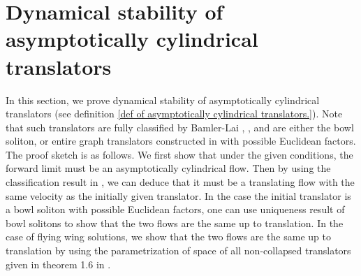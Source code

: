 \documentclass[pdflatex,sn-mathphys-num]{sn-jnl}%
\begin{document}
\section{Dynamical stability of asymptotically cylindrical translators}\label{asymptoticallycylindricalsection}
In this section, we prove dynamical stability of asymptotically cylindrical translators (see definition \ref{def of asymptotically cylindrical translators.}). Note that such translators are fully classified by Bamler-Lai \cite{Bamler2025-pdeodi}, \cite{Bamler2025-thclassification}, and are either the bowl soliton, or entire graph translators constructed in \cite{Hoffman2018GraphicalTF} with possible Euclidean factors. The proof sketch is as follows. We first show that under the given conditions, the forward limit must be an asymptotically cylindrical flow. Then by using the classification result in \cite{Bamler2025-thclassification}, we can deduce that it must be a translating flow with the same velocity as the initially given translator. In the case the initial translator is a bowl soliton with possible Euclidean factors, one can use uniqueness result of bowl solitons \cite{Haslhofer2014UniquenessOT} to show that the two flows are the same up to translation. In the case of flying wing solutions, we show that the two flows are the same up to translation by using the parametrization of space of all non-collapsed translators given in theorem 1.6 in \cite{Bamler2025-thclassification}. \\
\end{document}
